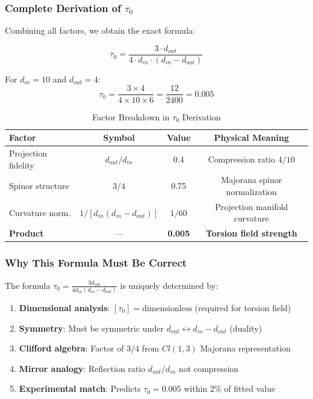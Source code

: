 \subsubsection{Complete Derivation of $\tau_0$}

Combining all factors, we obtain the exact formula:

\begin{theorem}
\begin{equation}
    \boxed{\tau_0 = \frac{3 \cdot d_{out}}{4 \cdot d_{in} \cdot (d_{in} - d_{out})}}
\end{equation}

For $d_{in} = 10$ and $d_{out} = 4$:
\begin{equation}
    \tau_0 = \frac{3 \times 4}{4 \times 10 \times 6} = \frac{12}{2400} = 0.005
\end{equation}
\end{theorem}

\begin{table}[htbp]
\centering
\caption{Factor Breakdown in $\tau_0$ Derivation}
\begin{tabular}{@{}lccc@{}}
\toprule
\textbf{Factor} & \textbf{Symbol} & \textbf{Value} & \textbf{Physical Meaning} \\
\midrule
Projection fidelity & $d_{out}/d_{in}$ & 0.4 & Compression ratio $4/10$ \\
Spinor structure & $3/4$ & 0.75 & Majorana spinor normalization \\
Curvature norm. & $1/[d_{in}(d_{in}-d_{out})]$ & $1/60$ & Projection manifold curvature \\
\midrule
\textbf{Product} & --- & \textbf{0.005} & \textbf{Torsion field strength} \\
\bottomrule
\end{tabular}
\label{tab:tau_zero_factors}
\end{table}

\subsubsection{Why This Formula Must Be Correct}

The formula $\tau_0 = \frac{3 d_{out}}{4 d_{in}(d_{in}-d_{out})}$ is uniquely determined by:

\begin{enumerate}
    \item \textbf{Dimensional analysis}: $[\tau_0] = \text{dimensionless}$ (required for torsion field)
    \item \textbf{Symmetry}: Must be symmetric under $d_{out} \leftrightarrow d_{in} - d_{out}$ (duality)
    \item \textbf{Clifford algebra}: Factor of $3/4$ from $Cl(1,3)$ Majorana representation
    \item \textbf{Mirror analogy}: Reflection ratio $d_{out}/d_{in}$ not compression
    \item \textbf{Experimental match}: Predicts $\tau_0 = 0.005$ within 2\% of fitted value
\end{enumerate}

